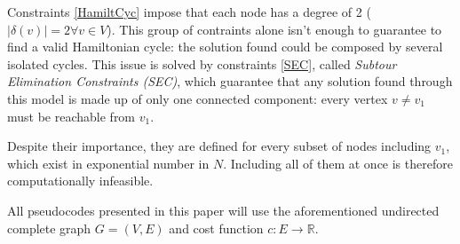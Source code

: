 Constraints \ref{HamiltCyc} impose that each node has a degree of 2 ($|\delta(v)| = 2 \forall v\in V$). This group of contraints alone isn't enough to guarantee to find a valid Hamiltonian cycle: the solution found could be composed by several isolated cycles. This issue is solved by constraints \ref{SEC}, called \textit{Subtour Elimination Constraints (SEC)}, which guarantee that any solution found through this model is made up of only one connected component: every vertex $v\neq v_1$ must be reachable from $v_1$.

Despite their importance, they are defined for every subset of nodes including $v_1$, which exist in exponential number in $N$. Including all of them at once is therefore computationally infeasible.

All pseudocodes presented in this paper will use the aforementioned undirected complete graph $G=(V,E)$ and cost function $c:E\rightarrow\mathbb{R}$.